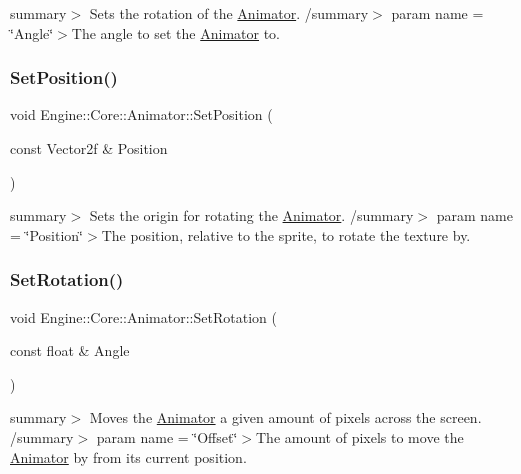 summary$>$ Sets the rotation of the \hyperlink{class_engine_1_1_core_1_1_animator}{Animator}. /summary$>$ param name = \char`\"{}\+Angle\char`\"{}$>$The angle to set the \hyperlink{class_engine_1_1_core_1_1_animator}{Animator} to.\mbox{\label{class_engine_1_1_core_1_1_animator_a1bfe987d5417116a39a8963a8f2ab4ca}} 
\subsubsection{\texorpdfstring{Set\+Position()}{SetPosition()}}
{\footnotesize\ttfamily void Engine\+::\+Core\+::\+Animator\+::\+Set\+Position (\begin{DoxyParamCaption}\item[{const Vector2f \&}]{Position }\end{DoxyParamCaption})}

summary$>$ Sets the origin for rotating the \hyperlink{class_engine_1_1_core_1_1_animator}{Animator}. /summary$>$ param name = \char`\"{}\+Position\char`\"{}$>$The position, relative to the sprite, to rotate the texture by.\mbox{\label{class_engine_1_1_core_1_1_animator_a5071cebf52c5e8e5f2dbebaa1b9621fd}} 
\subsubsection{\texorpdfstring{Set\+Rotation()}{SetRotation()}}
{\footnotesize\ttfamily void Engine\+::\+Core\+::\+Animator\+::\+Set\+Rotation (\begin{DoxyParamCaption}\item[{const float \&}]{Angle }\end{DoxyParamCaption})}

summary$>$ Moves the \hyperlink{class_engine_1_1_core_1_1_animator}{Animator} a given amount of pixels across the screen. /summary$>$ param name = \char`\"{}\+Offset\char`\"{}$>$The amount of pixels to move the \hyperlink{class_engine_1_1_core_1_1_animator}{Animator} by from its current position.\mbox{\label{class_engine_1_1_core_1_1_animator_acf3e63a6bc60cde6b4b26ed4387c92cc}} 

